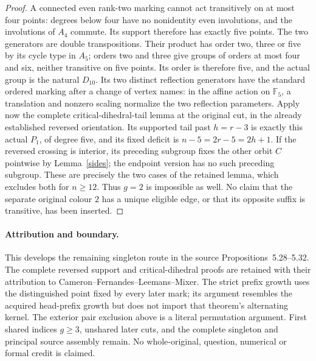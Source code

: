 \documentclass[11pt,a4paper]{article}
\begin{document}
\begin{proof}
A connected even rank-two marking cannot act transitively
on at most four points: degrees below four have no nonidentity
even involutions, and the involutions of $A_4$ commute.
Its support therefore has exactly five points. The two
generators are double transpositions. Their product has
order two, three or five by its cycle type in $A_5$;
orders two and three give groups of orders at most four
and six, neither transitive on five points. Its order is
therefore five, and the actual group is the natural $D_{10}$.
Its two distinct reflection generators have the standard ordered
marking after a change of vertex names: in the affine action on
$\mathbb F_5$, a translation and nonzero scaling normalize
the two reflection parameters.
Apply now the complete critical-dihedral-tail lemma at the
original cut, in the already established reversed orientation.
Its supported tail past $h=r-3$ is exactly this actual $P_1$,
of degree five, and its fixed deficit is
$n-5=2r-5=2h+1$. If the reversed crossing is interior,
its preceding subgroup fixes the other orbit $C$ pointwise
by Lemma~\ref{sides}; the endpoint version has no such
preceding subgroup. These are precisely the two cases of the
retained lemma, which excludes both for $n\ge12$.
Thus $g=2$ is impossible as well. No claim that the
separate original colour $2$ has a unique eligible edge, or
that its opposite suffix is transitive, has been inserted.
\end{proof}

\paragraph{Attribution and boundary.}
This develops the remaining singleton route in the source
Propositions~5.28--5.32. The complete reversed support and
critical-dihedral proofs are retained with their attribution
to Cameron--Fernandes--Leemans--Mixer. The strict prefix growth
uses the distinguished point fixed by every later mark; its
argument resembles the acquired head-prefix growth but does
not import that theorem's alternating kernel.
The exterior pair exclusion above is a literal permutation
argument. First shared indices $g\ge3$, unshared later cuts,
and the complete singleton and principal source assembly remain.
No whole-original, question, numerical or formal credit is claimed.
\end{document}
